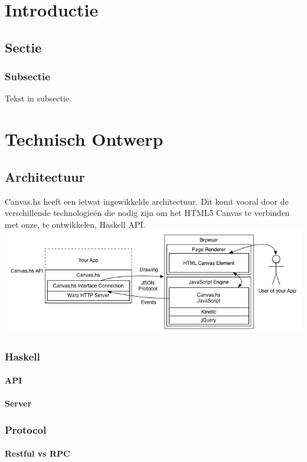 \documentclass[a4paper]{report}
\begin{document}


\chapter{Introductie}
\section{Sectie}
\subsection{Subsectie}
Tekst in subsectie.

\chapter{Technisch Ontwerp}
\section{Architectuur}
Canvas.hs heeft een ietwat ingewikkelde architectuur. Dit komt vooral door de verschillende technologieën die nodig zijn om het HTML5 Canvas te verbinden met onze, te ontwikkelen, Haskell API.
\includegraphics{architecture.png}
\subsection{Haskell}
\subsubsection{API}
\subsubsection{Server}
\subsection{Protocol}
\subsubsection{Restful vs RPC}
\end{document}
